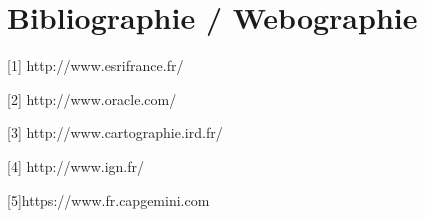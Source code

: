 \chapter{Bibliographie / Webographie}
\begin{description}
\item{[1]} http://www.esrifrance.fr/
\item{[2]} http://www.oracle.com/
\item{[3]} http://www.cartographie.ird.fr/
\item{[4]} http://www.ign.fr/
\item{[5]}https://www.fr.capgemini.com
\end{description}
